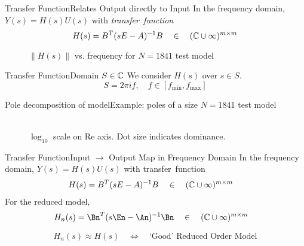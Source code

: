 \documentclass{beamer}
\begin{document}
\begin{frame}{Transfer Function}{Relates Output directly to Input}
    In the frequency domain, $Y(s) = H(s)U(s)$ with \emph{transfer~function}
 	 \[
 		H(s) =  B^T(sE-A)^{-1}B \quad\in\quad (\mathbb{C}\cup\infty)^{m \times m}
 	\]
 	\begin{figure}
	     \centering
	     	\caption{$\|H(s)\|$ vs. frequency for $N=1841$ test model}
     \end{figure}
 \end{frame}
 



 \begin{frame}{Transfer Function}{Domain $S\in\mathbb{C}$}
  We consider $H(s)$ over $s\in S$.
  \[
  		S = 2\pi if,\quad f\in\left[f_\mathrm{min},f_\mathrm{max}\right]
  \]
     \begin{figure}
     \centering
     	\hfill
     \end{figure}
 \end{frame}


\begin{frame}{Pole decomposition of model}{Example: poles of a size $N=1841$ test model}
	\begin{figure}[htbp]
		\centering
			\\ $\log_{10}$ scale on Re axis. Dot size indicates dominance.
	\end{figure}
\end{frame}




\begin{frame}{Transfer Function}{Input $\rightarrow$ Output Map in Frequency Domain}
    In the frequency domain, $Y(s) = H(s)U(s)$ with transfer~function 
 	\begin{align*}
 		H(s) &=  B^T(sE-A)^{-1}B \quad\in\quad (\mathbb{C}\cup\infty)^{m \times m}
 	\end{align*}
 	For the reduced model,
 	\begin{align*}
	 	H_n(s) &=  \Bn^T(s\En-\An)^{-1}\Bn \quad\in\quad (\C\cup\infty)^{\nin \times \nin}
 	\end{align*}
 	
 	\[
 		H_n(s)\approx H(s) \quad\Longleftrightarrow\quad
 		\text{`Good' Reduced Order Model}
  	\]
\end{frame}
 
\end{document}
